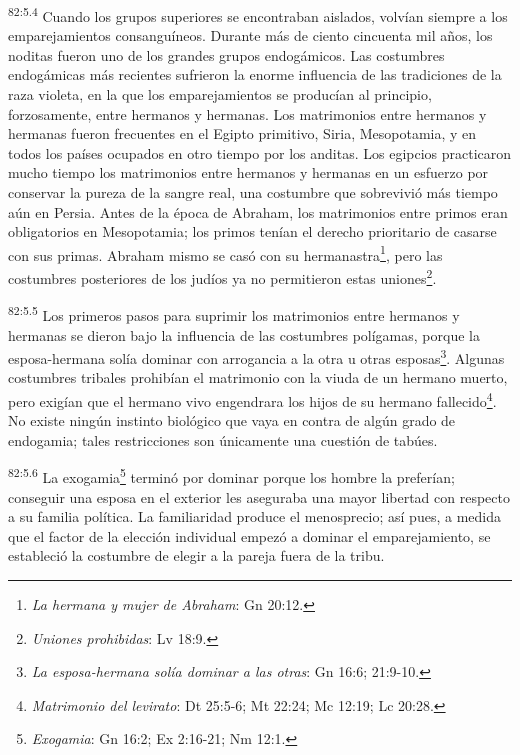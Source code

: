 \par
\textsuperscript{82:5.4} Cuando los grupos superiores se encontraban aislados, volvían siempre a los emparejamientos consanguíneos. Durante más de ciento cincuenta mil años, los noditas fueron uno de los grandes grupos endogámicos. Las costumbres endogámicas más recientes sufrieron la enorme influencia de las tradiciones de la raza violeta, en la que los emparejamientos se producían al principio, forzosamente, entre hermanos y hermanas. Los matrimonios entre hermanos y hermanas fueron frecuentes en el Egipto primitivo, Siria, Mesopotamia, y en todos los países ocupados en otro tiempo por los anditas. Los egipcios practicaron mucho tiempo los matrimonios entre hermanos y hermanas en un esfuerzo por conservar la pureza de la sangre real, una costumbre que sobrevivió más tiempo aún en Persia. Antes de la época de Abraham, los matrimonios entre primos eran obligatorios en Mesopotamia; los primos tenían el derecho prioritario de casarse con sus primas. Abraham mismo se casó con su hermanastra\footnote{\textit{La hermana y mujer de Abraham}: Gn 20:12.}, pero las costumbres posteriores de los judíos ya no permitieron estas uniones\footnote{\textit{Uniones prohibidas}: Lv 18:9.}.

\par
\textsuperscript{82:5.5} Los primeros pasos para suprimir los matrimonios entre hermanos y hermanas se dieron bajo la influencia de las costumbres polígamas, porque la esposa-hermana solía dominar con arrogancia a la otra u otras esposas\footnote{\textit{La esposa-hermana solía dominar a las otras}: Gn 16:6; 21:9-10.}. Algunas costumbres tribales prohibían el matrimonio con la viuda de un hermano muerto, pero exigían que el hermano vivo engendrara los hijos de su hermano fallecido\footnote{\textit{Matrimonio del levirato}: Dt 25:5-6; Mt 22:24; Mc 12:19; Lc 20:28.}. No existe ningún instinto biológico que vaya en contra de algún grado de endogamia; tales restricciones son únicamente una cuestión de tabúes.

\par
\textsuperscript{82:5.6} La exogamia\footnote{\textit{Exogamia}: Gn 16:2; Ex 2:16-21; Nm 12:1.} terminó por dominar porque los hombre la preferían; conseguir una esposa en el exterior les aseguraba una mayor libertad con respecto a su familia política. La familiaridad produce el menosprecio; así pues, a medida que el factor de la elección individual empezó a dominar el emparejamiento, se estableció la costumbre de elegir a la pareja fuera de la tribu.

